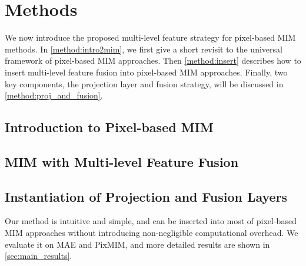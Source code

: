 \section{Methods}

We now introduce the proposed multi-level feature strategy for pixel-based MIM methods. In \autoref{method:intro2mim}, we first give a short revisit to the universal framework of pixel-based MIM approaches. Then \autoref{method:insert} describes how to insert multi-level feature fusion into pixel-based MIM approaches. Finally, two key components, the projection layer and fusion strategy, will be discussed in \autoref{method:proj_and_fusion}.

\subsection{Introduction to Pixel-based MIM}
\label{method:intro2mim}


\subsection{MIM with Multi-level Feature Fusion}
\label{method:insert}


\subsection{Instantiation of Projection and Fusion Layers}
\label{method:proj_and_fusion}


\hspace*{\fill}

Our method is intuitive and simple, and can be inserted into most of pixel-based MIM approaches without introducing non-negligible computational overhead. We evaluate it on MAE\cite{MAE} and PixMIM\cite{pixmim}, and more detailed results are shown in \autoref{sec:main_results}.
